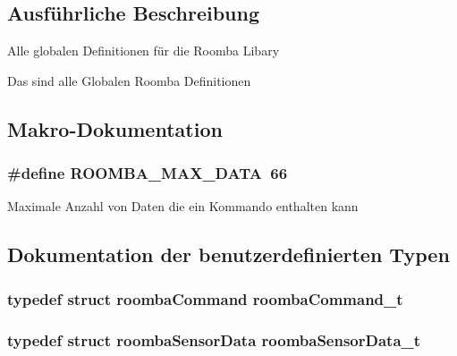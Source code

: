 \subsection{Ausführliche Beschreibung}
Alle globalen Definitionen für die Roomba Libary

Das sind alle Globalen Roomba Definitionen 

\subsection{Makro-\/\-Dokumentation}
\hypertarget{group__roomba__def_ga53c32c129fde6d7594f43690d6d81d97}{
\subsubsection[{R\-O\-O\-M\-B\-A\-\_\-\-M\-A\-X\-\_\-\-D\-A\-T\-A}]{\setlength{\rightskip}{0pt plus 5cm}\#define R\-O\-O\-M\-B\-A\-\_\-\-M\-A\-X\-\_\-\-D\-A\-T\-A~66}}\label{group__roomba__def_ga53c32c129fde6d7594f43690d6d81d97}
Maximale Anzahl von Daten die ein Kommando enthalten kann 

\subsection{Dokumentation der benutzerdefinierten Typen}
\hypertarget{group__roomba__def_gae2455d95f239542954d232e31bb04a0e}{
\subsubsection[{roomba\-Command\-\_\-t}]{\setlength{\rightskip}{0pt plus 5cm}typedef struct {\bf roomba\-Command} {\bf roomba\-Command\-\_\-t}}}\label{group__roomba__def_gae2455d95f239542954d232e31bb04a0e}
\hypertarget{group__roomba__def_gab15b5566c76fa573575afaccd593e86a}{
\subsubsection[{roomba\-Sensor\-Data\-\_\-t}]{\setlength{\rightskip}{0pt plus 5cm}typedef struct {\bf roomba\-Sensor\-Data} {\bf roomba\-Sensor\-Data\-\_\-t}}}\label{group__roomba__def_gab15b5566c76fa573575afaccd593e86a}
